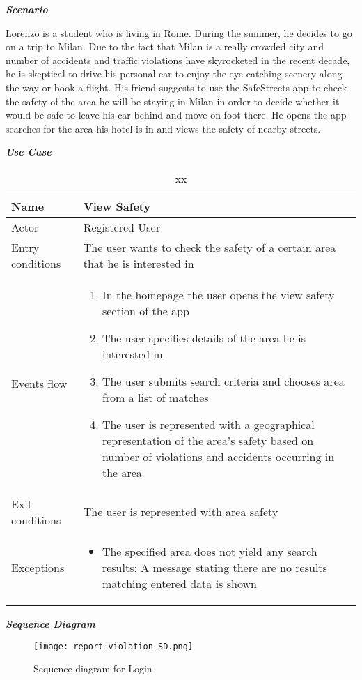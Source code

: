 \emph{\textbf{Scenario}}

Lorenzo is a student who is living in Rome. During the summer, he decides to go on a trip to Milan. Due to the fact that Milan is a really crowded city and number of accidents and traffic violations have skyrocketed in the recent decade, he is skeptical to drive his personal car to enjoy the eye-catching scenery along the way or book a flight. His friend suggests to use the SafeStreets app to check the safety of the area he will be staying in Milan in order to decide whether it would be safe to leave his car behind and move on foot there. He opens the app searches for the area his hotel is in and views the safety of nearby streets.

\emph{\textbf{Use Case}}

\begin{table}[!hbtp]
\footnotesize
\centering
\settowidth{}
\setlength\extrarowheight{2pt}
\begin{tabulary}{\textwidth}{|J|J|}
\hline
Name  & View Safety \\
\hline
Actor & Registered User \\
\hline
Entry conditions & The user wants to check the safety of a certain area that he is interested in \\
\hline
Events flow & 
\begin{minipage}[t]{0.7\textwidth}
\begin{enumerate} 
\item In the homepage the user opens the view safety section of the app
\item The user specifies details of the area he is interested in
\item The user submits search criteria and chooses area from a list of matches
\item The user is represented with a geographical representation of the area’s safety based on number of violations and accidents occurring in the area
\end{enumerate}
\end{minipage}\\
\hline
Exit conditions  & The user is represented with area safety\\
\hline
Exceptions       & 
\begin{minipage}[t]{0.8\textwidth}
\begin{itemize} 
\item The specified area does not yield any search results: A message stating there are no results matching entered data is shown
\end{itemize}
\end{minipage}\\
\hline
\end{tabulary}
\caption{\label{tab:xx}xx}
\end{table}

\emph{\textbf{Sequence Diagram}}

\begin{figure}[H]
\caption{Sequence diagram for Login}
\label{fig:SD-login}
\centering
\texttt{[image: report-violation-SD.png]}
\end{figure}


